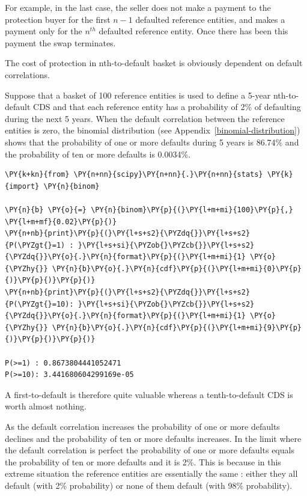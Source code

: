 For example, in the last case, the
seller does not make a payment to the protection buyer for
the first $n-1$ defaulted reference entities, and makes a payment only for the
$n^{th}$ defaulted reference entity. Once there has been this payment the swap terminates.

The cost of protection in nth-to-default basket is obviously dependent on default correlations. 

Suppose that a basket of 100 reference entities is used to define a 5-year nth-to-default CDS and that each reference entity has a probability of 2\% of defaulting during the next
5 years. When the default correlation between the reference entities is zero, the binomial distribution (see Appendix~\ref{binomial-distribution}) 
shows that the probability of one or more defaults during 5 years is 86.74\% and the probability of ten or more defaults is 0.0034\%.

\begin{tcolorbox}[breakable, size=fbox, boxrule=1pt, pad at break*=1mm,colback=cellbackground, colframe=cellborder]
\begin{Verbatim}[commandchars=\\\{\}]
\PY{k+kn}{from} \PY{n+nn}{scipy}\PY{n+nn}{.}\PY{n+nn}{stats} \PY{k}{import} \PY{n}{binom}
	
\PY{n}{b} \PY{o}{=} \PY{n}{binom}\PY{p}{(}\PY{l+m+mi}{100}\PY{p}{,} \PY{l+m+mf}{0.02}\PY{p}{)}
\PY{n+nb}{print}\PY{p}{(}\PY{l+s+s2}{\PYZdq{}}\PY{l+s+s2}{P(\PYZgt{}=1) : }\PY{l+s+si}{\PYZob{}\PYZcb{}}\PY{l+s+s2}{\PYZdq{}}\PY{o}{.}\PY{n}{format}\PY{p}{(}\PY{l+m+mi}{1} \PY{o}{\PYZhy{}} \PY{n}{b}\PY{o}{.}\PY{n}{cdf}\PY{p}{(}\PY{l+m+mi}{0}\PY{p}{)}\PY{p}{)}\PY{p}{)}
\PY{n+nb}{print}\PY{p}{(}\PY{l+s+s2}{\PYZdq{}}\PY{l+s+s2}{P(\PYZgt{}=10): }\PY{l+s+si}{\PYZob{}\PYZcb{}}\PY{l+s+s2}{\PYZdq{}}\PY{o}{.}\PY{n}{format}\PY{p}{(}\PY{l+m+mi}{1} \PY{o}{\PYZhy{}} \PY{n}{b}\PY{o}{.}\PY{n}{cdf}\PY{p}{(}\PY{l+m+mi}{9}\PY{p}{)}\PY{p}{)}\PY{p}{)}
	
P(>=1) : 0.8673804441052471
P(>=10): 3.441680604299169e-05
\end{Verbatim}
\end{tcolorbox}

A first-to-default is therefore quite valuable whereas a tenth-to-default CDS is worth almost nothing.

As the default correlation increases the probability of one or more defaults declines and the probability of ten or more defaults increases. In the limit where the default correlation is perfect the probability of one or more defaults equals the probability of ten or more defaults and it is 2\%. This is because in this extreme situation the reference entities are essentially the same : either they all default (with 2\% probability) or none of them default (with 98\% probability).

